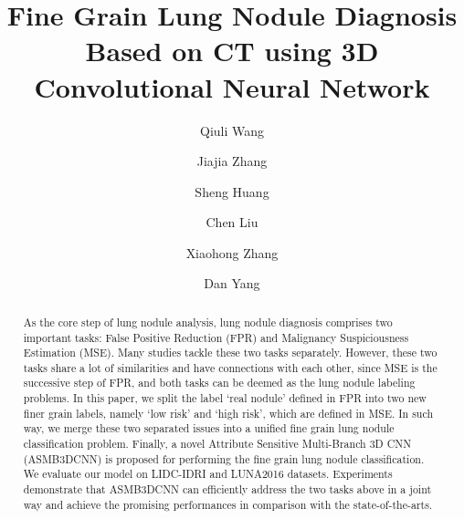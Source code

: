 \documentclass[runningheads]{llncs}
\begin{document}
%
\title{Fine Grain Lung Nodule Diagnosis Based on CT using 3D Convolutional Neural Network}
%
%
\author{Qiuli Wang\and
Jiajia Zhang \and
Sheng Huang \and
Chen Liu\and
Xiaohong Zhang\and
Dan Yang 
}
%
%
%
\maketitle              %
%
\begin{abstract}
As the core step of lung nodule analysis, lung nodule diagnosis comprises two important tasks: False Positive Reduction (FPR) and Malignancy Suspiciousness Estimation (MSE). Many studies tackle these two tasks separately. However, these two tasks share a lot of similarities and have connections with each other, since MSE is the successive step of FPR, and both tasks can be deemed as the lung nodule labeling problems. In this paper, we split the label `real nodule' defined in FPR into two new finer grain labels, namely `low risk' and `high risk', which are defined in MSE. In such way, we merge these two separated issues into a unified fine grain lung nodule classification problem. Finally, a novel Attribute Sensitive Multi-Branch 3D CNN (ASMB3DCNN) is proposed for performing the fine grain lung nodule classification. We evaluate our model on LIDC-IDRI and LUNA2016 datasets. Experiments demonstrate that ASMB3DCNN can efficiently address the two tasks above in a joint way and achieve the promising performances in comparison with the state-of-the-arts.


\end{abstract}
\end{document}
